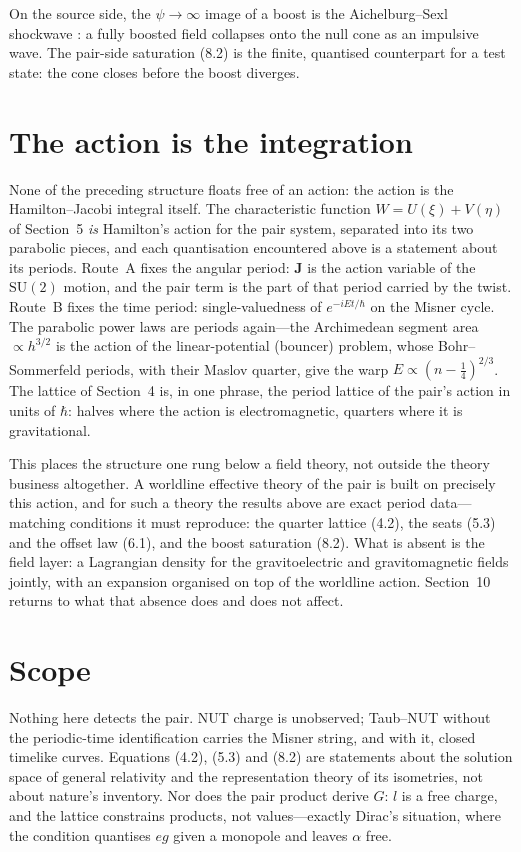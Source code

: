 \documentclass[11pt]{article}
\numberwithin{equation}{section}
\begin{document}
On the source side, the $\psi\to\infty$ image of a boost is the
Aichelburg--Sexl shockwave \cite{AS}: a fully boosted field collapses onto
the null cone as an impulsive wave. The pair-side saturation (8.2) is the
finite, quantised counterpart for a test state: the cone closes before
the boost diverges.

\section{The action is the integration}

None of the preceding structure floats free of an action: the action is
the Hamilton--Jacobi integral itself. The characteristic function
$W=U(\xi)+V(\eta)$ of Section~5 \emph{is} Hamilton's action for the pair
system, separated into its two parabolic pieces, and each quantisation
encountered above is a statement about its periods. Route~A fixes the
angular period: $\mathbf{J}$ is the action variable of the
$\mathrm{SU}(2)$ motion, and the pair term is the part of that period
carried by the twist. Route~B fixes the time period: single-valuedness of
$e^{-iEt/\hbar}$ on the Misner cycle. The parabolic power laws are
periods again---the Archimedean segment area $\propto h^{3/2}$ is the
action of the linear-potential (bouncer) problem, whose Bohr--Sommerfeld
periods, with their Maslov quarter, give the warp
$E\propto(n-\tfrac14)^{2/3}$. The lattice of Section~4 is, in one phrase,
the period lattice of the pair's action in units of $\hbar$: halves where
the action is electromagnetic, quarters where it is gravitational.

This places the structure one rung below a field theory, not outside the
theory business altogether. A worldline effective theory of the pair is
built on precisely this action, and for such a theory the results above
are exact period data---matching conditions it must reproduce: the
quarter lattice (4.2), the seats (5.3) and the offset law (6.1), and the
boost saturation (8.2). What is absent is the field layer: a Lagrangian
density for the gravitoelectric and gravitomagnetic fields jointly, with
an expansion organised on top of the worldline action. Section~10 returns
to what that absence does and does not affect.

\section{Scope}

Nothing here detects the pair. NUT charge is unobserved; Taub--NUT without
the periodic-time identification carries the Misner string, and with it,
closed timelike curves. Equations (4.2), (5.3) and (8.2) are statements
about the solution space of general relativity and the representation
theory of its isometries, not about nature's inventory. Nor does the pair
product derive $G$: $l$ is a free charge, and the lattice constrains
products, not values---exactly Dirac's situation, where the condition
quantises $eg$ given a monopole and leaves $\alpha$ free.
\end{document}

